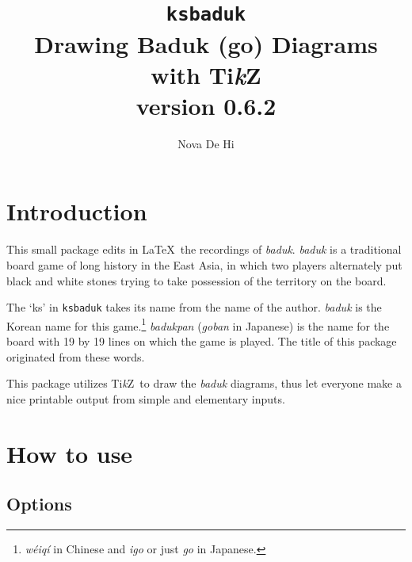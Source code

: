 \documentclass[a4paper]{oblivoir}
\newcommand\thisfileversion{0.6.2}
\def\TikZ{Ti\textit{k}Z}
\begin{document}
\title{%
\texttt{ksbaduk} \\
{\large Drawing Baduk (go) Diagrams with \TikZ} \\
{\large version \thisfileversion}
}
\author{Nova De Hi}
\maketitle

\tableofcontents*


\section{%
Introduction
}

This small package edits in \LaTeX\ the recordings of \textit{baduk}. \textit{baduk} is a traditional board game of long history in the East Asia, in which two players alternately put black and white stones trying to take possession of the territory on the board.

The `ks' in \texttt{ksbaduk} takes its name from the name of the author.
\textit{baduk} is the Korean name for this game.\footnote{\textit{w\'{e}iq\'{i}} in Chinese and \textit{igo} or just \textit{go} in Japanese.}
\textit{badukpan} (\textit{goban} in Japanese) is the name for the board with 19 by 19 lines on which the game is played. The title of this package originated from these words.

This package utilizes \TikZ\ to draw the \textit{baduk} diagrams, thus let everyone make a nice printable output from simple and elementary inputs.

\section{%
How to use
}

\subsection{%
Options
}

\begin{boxedverbatim}
\usepackage[%
    ball, %
    badukpancolor=<color>,
    badukpansize=<number>,
    posmark,
    imageback,
    imagefile=<file>,
    textcmds,
    numberfont=<font>,
    tmarkfont=<font>
]{ksbaduk}
\end{boxedverbatim}
\end{document}
